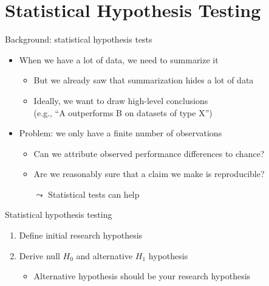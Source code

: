 \section{Statistical Hypothesis Testing}
\begin{frame}[c]{Background: statistical hypothesis tests}

\begin{itemize}
	\item When we have a lot of data, we need to summarize it
	\begin{itemize}
		\item But we already saw that summarization hides a lot of data
		\item Ideally, we want to draw high-level conclusions\\
		(e.g., ``A outperforms B on datasets of type X'')
	\end{itemize}
	
	\pause
	\bigskip
	
	\item Problem: we only have a finite number of observations
	\begin{itemize}
		\item Can we attribute observed performance differences to chance?
		\item Are we reasonably sure that a claim we make is reproducible?
		\item[$\leadsto$] Statistical tests can help
	\end{itemize}
	
	
\end{itemize}

\medskip

\end{frame}
\begin{frame}[c]{Statistical hypothesis testing}

\begin{enumerate}
\item Define initial research hypothesis
\pause
\item Derive null $H_0$ and alternative $H_1$ hypothesis
\begin{itemize}
	\item Alternative hypothesis should be your research hypothesis
\end{itemize}
\end{enumerate}	

\end{frame}
